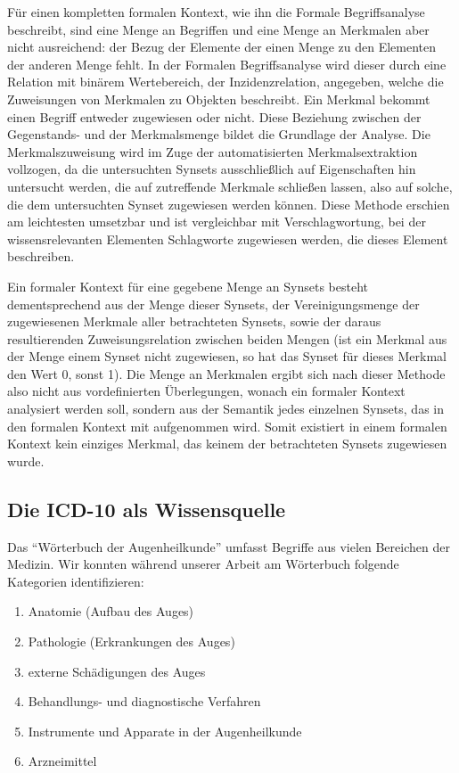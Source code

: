 \documentclass[pagesize,DIV=calc,12pt,final]{scrreprt}
\begin{document}
Für einen kompletten formalen Kontext, wie ihn die Formale Begriffsanalyse beschreibt, sind eine Menge an Begriffen und eine Menge an Merkmalen aber nicht ausreichend: der Bezug der Elemente der einen Menge zu den Elementen der anderen Menge fehlt. 
In der Formalen Begriffsanalyse wird dieser durch eine Relation mit binärem Wertebereich, der Inzidenzrelation, angegeben, welche die Zuweisungen von Merkmalen zu Objekten beschreibt. 
Ein Merkmal bekommt einen Begriff entweder zugewiesen oder nicht. 
Diese Beziehung zwischen der Gegenstands- und der Merkmalsmenge bildet die Grundlage der Analyse. 
Die Merkmalszuweisung wird im Zuge der automatisierten Merkmalsextraktion vollzogen, da die untersuchten Synsets ausschließlich auf Eigenschaften hin untersucht werden, die auf zutreffende Merkmale schließen lassen, also auf solche, die dem untersuchten Synset zugewiesen werden können. 
Diese Methode erschien am leichtesten umsetzbar und ist vergleichbar mit Verschlagwortung, bei der wissensrelevanten Elementen Schlagworte zugewiesen werden, die dieses Element beschreiben. 

Ein formaler Kontext für eine gegebene Menge an Synsets besteht dementsprechend aus der Menge dieser Synsets, der Vereinigungsmenge der zugewiesenen Merkmale aller betrachteten Synsets, sowie der daraus resultierenden Zuweisungsrelation zwischen beiden Mengen (ist ein Merkmal aus der Menge einem Synset nicht zugewiesen, so hat das Synset für dieses Merkmal den Wert 0, sonst 1). 
Die Menge an Merkmalen ergibt sich nach dieser Methode also nicht aus vordefinierten Überlegungen, wonach ein formaler Kontext analysiert werden soll, sondern aus der Semantik jedes einzelnen Synsets, das in den formalen Kontext mit aufgenommen wird. 
Somit existiert in einem formalen Kontext kein einziges Merkmal, das keinem der betrachteten Synsets zugewiesen wurde. 

\subsection{Die ICD-10 als Wissensquelle}

Das \enquote{Wörterbuch der Augenheilkunde} umfasst Begriffe aus vielen Bereichen der Medizin. 
Wir konnten während unserer Arbeit am Wörterbuch folgende Kategorien identifizieren: 

\begin{enumerate}
\item
 Anatomie (Aufbau des Auges)
\item
 Pathologie (Erkrankungen des Auges)
\item
 externe Schädigungen des Auges
\item
 Behandlungs- und diagnostische Verfahren
\item
 Instrumente und Apparate in der Augenheilkunde
\item
 Arzneimittel
\end{enumerate}
\end{document}
